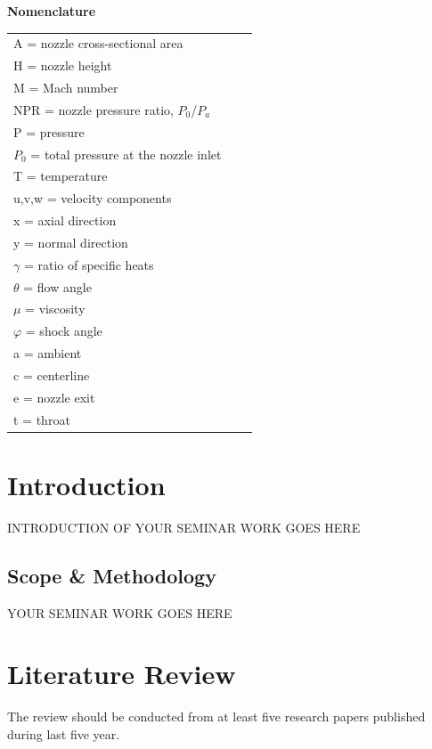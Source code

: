 \documentclass[12pt, a4paper]{article}
\begin{document}
\linespread{1.5}

\newpage
\listoffigures

\newpage
\listoftables

\newpage
\Large{\bf Nomenclature}
\\
\normalsize
\begin{tabular}{lcl}
A = nozzle cross-sectional area & & \\
H = nozzle height & & \\
M = Mach number & & \\
NPR = nozzle pressure ratio, $P_0$/$P_a$ & & \\
P = pressure & & \\
$P_0$ = total pressure at the nozzle inlet & & \\
T = temperature & & \\
u,v,w = velocity components & & \\
x = axial direction & & \\
y = normal direction & & \\
$\gamma$ = ratio of specific heats & & \\
$\theta$ = flow angle & & \\
$\mu$ = viscosity & & \\
$\varphi$ = shock angle & & \\
a = ambient & & \\
c = centerline & & \\
e = nozzle exit & & \\
t = throat & & \\
\end{tabular}


\newpage
\tableofcontents

\newpage
{}

\newpage
\section{Introduction}
INTRODUCTION OF YOUR SEMINAR WORK GOES HERE

\subsection{Scope \& Methodology}
YOUR SEMINAR WORK GOES HERE

\newpage
\section{Literature Review}
The review should be conducted from at least five research papers
published during last five year.
\end{document}
